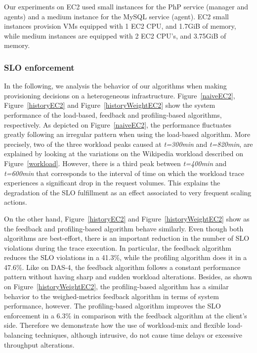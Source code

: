 Our experiments on EC2 used small instances for the PhP service (manager and agents) and  a medium instance for the MySQL service (agent). EC2 small instances provision VMs equipped with 1 EC2 CPU, and 1.7GiB of memory, while medium instances are equipped with 2 EC2 CPU's, and 3.75GiB of memory.

\subsubsection{SLO enforcement}

In the following, we analysis the behavior of our algorithms when making provisioning decisions on a heterogeneous infrastructure. Figure~\ref{naiveEC2}, Figure~\ref{historyEC2} and Figure~\ref{historyWeightEC2} show the system performance of the load-based, feedback and profiling-based algorithms, respectively. As depicted on Figure~\ref{naiveEC2}, the performance fluctuates greatly following an irregular pattern when using the load-based algorithm. More precisely, two of the three workload peaks caused at \emph{t=300min} and \emph{t=820min}, are explained by looking at the variations on the Wikipedia workload described on Figure~\ref{workload}. However, there is a third peak between \emph{t=400min} and \emph{t=600min} that corresponds to the interval of time on which the workload trace experiences a significant drop in the request volumes. This explains the degradation of the SLO fulfillment as an effect associated to very frequent scaling actions. 

On the other hand, Figure~\ref{historyEC2} and Figure~\ref{historyWeightEC2} show as the feedback and profiling-based algorithm behave similarly. Even though both algorithms are best-effort, there is an important reduction in the number of SLO violations during the trace execution. In particular, the feedback algorithm reduces the SLO violations in a  41.3\%, while the profiling algorithm does it in a 47.6\%. Like on DAS-4, the feedback algorithm follows a constant performance pattern without having sharp and sudden workload alterations. Besides, as shown on Figure~\ref{historyWeightEC2}, the profiling-based algorithm has a similar behavior to the weighed-metrics feedback algorithm in terms of system performance, however. The profiling-based algorithm improves the SLO enforcement in a 6.3\% in comparison with the feedback algorithm at the client's side. Therefore we demonstrate how the use of workload-mix and flexible load-balancing techniques, although intrusive, do not cause time delays or excessive throughput alterations. 



